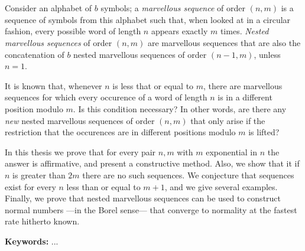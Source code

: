 \chapter*{\runtitle}

Consider an alphabet of $b$ symbols; a \emph{marvellous sequence} of
order $(n,m)$ is a sequence of symbols from this alphabet such that,
when looked at in a circular fashion, every possible word of length $n$ appears
exactly $m$ times.
\emph{Nested marvellous sequences} of order $(n,m)$ are marvellous
sequences that are also the concatenation of $b$ nested
marvellous sequences of order $(n-1,m)$, unless $n = 1$.

It is known that, whenever $n$ is less that or equal to $m$, there are marvellous
sequences for which every occurence of a word of length $n$ is in a different
position modulo $m$. Is this condition necessary? In other words,
are there any \emph{new} nested marvellous sequences of order $(n,m)$ that only
arise if the restriction that the occurences are in different positions modulo
$m$ is lifted?

In this thesis we prove that for every pair $n,m$ with $m$ exponential in $n$
the answer is affirmative, and present a constructive method.
Also, we show that it if $n$ is greater than $2m$ there are no such sequences.
We conjecture that sequences exist for every $n$ less than or equal to $m + 1$,
and we give several examples.
Finally, we prove that nested marvellous sequences can be used to construct
normal numbers ---in the Borel sense--- that converge to normality at the
fastest rate hitherto known.

\bigskip

\noindent\textbf{Keywords:} ...
